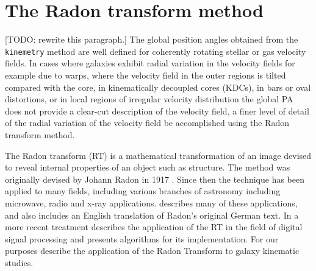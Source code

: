 \section{The Radon transform method}
\label{sec:Radon}
[TODO: rewrite this paragraph.] The global position angles obtained from the \texttt{kinemetry} method are well defined for coherently rotating stellar or gas velocity fields. In cases where galaxies exhibit radial variation in the velocity fields for example due to warps, where the velocity field in the outer regions is tilted compared with the core, in kinematically decoupled cores (KDCs), in bars or oval distortions, or in local regions of irregular velocity distribution the global PA does not provide a clear-cut description of the velocity field, a finer level of detail of the radial variation of the velocity field be accomplished using the Radon transform method. 

The Radon transform (RT) is a mathematical transformation of an image devised to reveal internal properties of an object such as structure. The method was originally devised by Johann Radon in 1917 \citep{radon1917determination}. Since then the technique has been applied to many fields, including various branches of astronomy including microwave, radio and x-ray applications. \citet{deans2007radon} describes many of these applications, and also includes an English translation of Radon's original German text. In a more recent treatment  \citet{7910dc8d5b654c90ac4bc94c67d06f01} describes the application of the RT in the field of digital signal processing and presents algorithms for its implementation. For our purposes \cite{2018MNRAS.480.2217S} describe the application of the Radon Transform to galaxy kinematic studies.  

